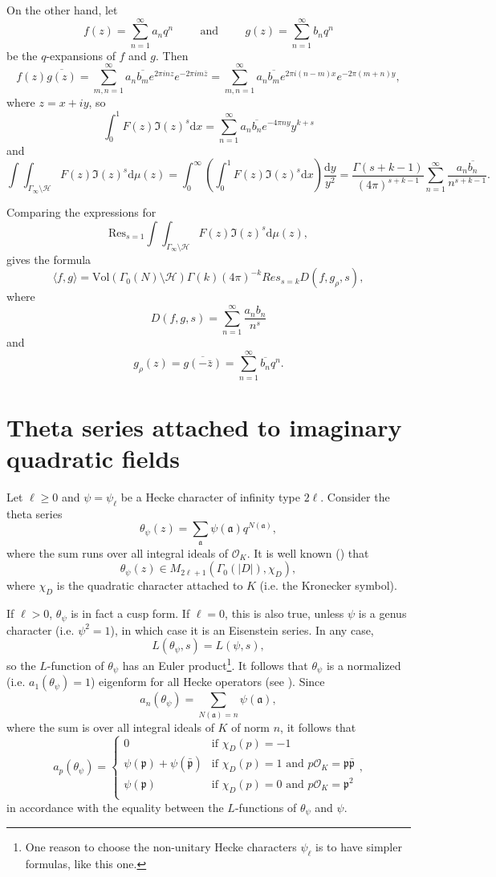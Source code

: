 \documentclass[twoside,10pt]{article}
\newcommand{\esp}{\hspace{1cm}}
\newcommand{\Res}{\textrm{Res}}
\renewcommand{\H}{\mathcal{H}}
\newcommand{\p}{\mathfrak{p}}
\newcommand{\ida}{\mathfrak{a}}
\renewcommand{\O}{\mathcal{O}}
\renewcommand{\d}{\text{d}}
\newcommand{\tpsi}{\theta_\psi}
\begin{document}
On the other hand, let
\[f(z)=\sum_{n=1}^\infty a_nq^n\esp\text{and}\esp g(z)=\sum_{n=1}^\infty b_nq^n\]
be the $q$-expansions of $f$ and $g$. Then
\[f(z)\overline{g(z)}=\sum_{m,n=1}^\infty a_n\overline{b_m}e^{2\pi inz}e^{-2\pi i m\bar{z}}=\sum_{m,n=1}^\infty a_n\overline{b_m}e^{2\pi i(n-m)x}e^{-2\pi (m+n)y},\]
where $z=x+iy$, so 
\[\int_0^1F(z)\Im(z)^s\d x=\sum_{n=1}^\infty a_n\overline{b_n}e^{-4\pi ny}y^{k+s}\]
and
\[\int\int_{\Gamma_\infty\setminus\H}F(z)\Im(z)^s\d\mu(z)=\int_0^\infty\left (\int_0^1F(z)\Im(z)^s\d x\right )\frac{\d y}{y^2}=\frac{\Gamma(s+k-1)}{(4\pi)^{s+k-1}}\sum_{n=1}^\infty\frac{a_n\overline{b_n}}{n^{s+k-1}}.\]

Comparing the expressions for
\[\Res_{s=1}\int\int_{\Gamma_\infty\setminus\H}F(z)\Im(z)^s\d\mu(z),\]
gives the formula
\begin{equation}\label{RankinSelberg}
	\langle f,g\rangle=\text{Vol}(\Gamma_0(N)\setminus\H)\Gamma(k)(4\pi)^{-k}Res_{s=k}D(f,g_\rho,s),
\end{equation}
where
\[D(f,g,s)=\sum_{n=1}^\infty\frac{a_nb_n}{n^{s}}\]
and
\[g_\rho(z)=\overline{g(-\bar{z})}=\sum_{n=1}^\infty \overline{b_n} q^n.\]

\section{Theta series attached to imaginary quadratic fields}
Let $\ell\geq 0$ and $\psi=\psi_\ell$ be a Hecke character of infinity type $2\ell$. Consider the theta series
\[\tpsi(z)=\sum_{\ida}\psi(\ida)q^{N(\ida)},\]
where the sum runs over all integral ideals of $\O_K$. It is well known (\cite[Thm. 12.5]{Iwan}) that
\[\tpsi(z)\in M_{2\ell+1}(\Gamma_0(|D|),\chi_D),\]
where $\chi_D$ is the quadratic character attached to $K$ (i.e. the Kronecker symbol).

If $\ell>0$, $\tpsi$ is in fact a cusp form. If $\ell=0$, this is also true, unless $\psi$ is a genus character (i.e. $\psi^2=1$), in which case it is an Eisenstein series. In any case,
\[L(\tpsi,s)=L(\psi,s),\]
so the $L$-function of $\tpsi$ has an Euler product\footnote{One reason to choose the non-unitary Hecke characters $\psi_\ell$ is to have simpler formulas, like this one.}. It follows that $\tpsi$ is a normalized (i.e. $a_1(\tpsi)=1$) eigenform for all Hecke operators (see \cite[Thm. 5.9.2]{DiSh}). Since
\[a_n(\tpsi)=\sum_{N(\ida)=n}\psi(\ida),\]
where the sum is over all integral ideals of $K$ of norm $n$, it follows that
\[a_p(\tpsi)=\begin{cases}
	0	&\text{if } \chi_D(p)=-1\\
	\psi(\p)+\psi(\bar{\p}) &\text{if } \chi_D(p)=1 \text{ and }p\O_K=\p\bar{\p}\\
	\psi(\p)&\text{if }  \chi_D(p)=0 \text{ and }p\O_K=\p^2\\
\end{cases},\]
in accordance with the equality between the $L$-functions of $\tpsi$ and $\psi$.
\end{document}
